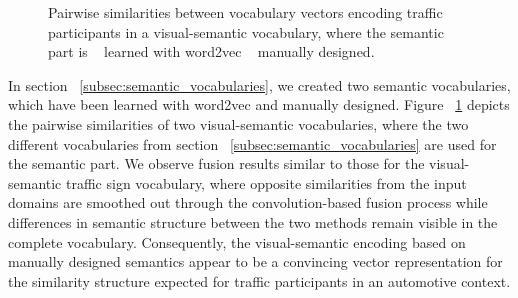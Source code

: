 \begin{figure}[t]
    \centering
    \caption{Pairwise similarities between vocabulary vectors encoding traffic participants in a visual-semantic vocabulary, where the semantic part is  ~\protect{} learned with word2vec ~\protect{} manually designed.}
    \label{fig:visual_semantic_vocab_traffic_participants_internal_similarities}
\end{figure}

In section ~\ref{subsec:semantic_vocabularies}, we created two semantic vocabularies, which have been learned with word2vec and manually designed.
Figure ~\ref{fig:visual_semantic_vocab_traffic_participants_internal_similarities} depicts the pairwise similarities of two visual-semantic vocabularies, where the two different vocabularies from section ~\ref{subsec:semantic_vocabularies} are used for the semantic part.
We observe fusion results similar to those for the visual-semantic traffic sign vocabulary, where opposite similarities from the input domains are smoothed out through the convolution-based fusion process while differences in semantic structure between the two methods remain visible in the complete vocabulary.
Consequently, the visual-semantic encoding based on manually designed semantics appear to be a convincing vector representation for the similarity structure expected for traffic participants in an automotive context.

